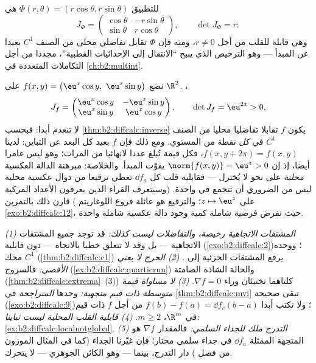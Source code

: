 \begin{example}\label{ex:b2:diffcalc:polar}
 للتطبيق $\Phi(r, \theta) = (r\cos\theta, r\sin\theta)$ هي
\[
J_\Phi = \begin{pmatrix} \cos\theta & -r\sin\theta\\ \sin\theta &
r\cos\theta \end{pmatrix},
\qquad \det J_\Phi = r :
\]
وهي قابلة للقلب من أجل $r \neq 0$، ومنه فإن $\Phi$ تقابل تفاضلي محلي من
الصنف $C^1$ بعيدا عن المبدأ --- وهو الترخيص الذي يبيح ``الانتقال
إلى الإحداثيات القطبية''، مجددا من أجل التكاملات المتعددة في
\cref{ch:b2:multint}.
\end{example}

\begin{example}\label{ex:b2:diffcalc:localnotglobal}
نضع $f(x, y) = \bigl(\eu^x\cos y,\ \eu^x\sin y\bigr)$ على
$\R^2$. ،
\[
J_f = \begin{pmatrix}
\eu^x\cos y & -\eu^x\sin y\\
\eu^x\sin y & \eu^x\cos y
\end{pmatrix},
\qquad
\det J_f = \eu^{2x} > 0 ,
\]
لا تنعدم أبدا: فبحسب \cref{thm:b2:diffcalc:inverse} يكون $f$ تقابلا تفاضليا محليا من
الصنف $C^1$ في \emph{كل} نقطة من المستوي.
ومع ذلك فإن $f$ بعيد كل البعد عن التباين: لدينا $f(x, y + 2\pi) = f(x, y)$، فكل قيمة
تُبلغ عددا لانهائيا من المرات؛ وهو ليس غامرا أيضا، إذ إن $\norm{f(x, y)} = \eu^x > 0$
يفوّت المبدأ. والخلاصة: مبرهنة الدالة العكسية \emph{محلية} على نحو
لا يُختزل --- فقابلية قلب كل $\dd f_a$ تعطي ترقيعا من دوال عكسية محلية
ليس من الضروري أن تتجمع في واحدة.
(وسيتعرف القراء الذين يعرفون الأعداد المركبة على $z \mapsto
\eu^z$؛ والترقيع هو
عائلة فروع اللوغاريتم.)
قارن ذلك بالتمرين \cref{exo:b2:diffcalc:12}، حيث تفرض فرضية شاملة كمية وجود دالة عكسية
شاملة واحدة.
\end{example}

\begin{remark}
\emph{(1) المشتقات الاتجاهية رخيصة، والتفاضلات ليست كذلك:} قد توجد
جميع المشتقات الاتجاهية --- بل وقد لا تتعلق خطيا بالاتجاه --- دون
قابلية  (\cref{exo:b2:diffcalc:2})؛ ووحده محك $C^1$
(\cref{thm:b2:diffcalc:c1}) يرفع المشتقات الجزئية إلى .
\emph{(2) الحرج لا يعني الأقصى:} فالسروج (\cref{ex:b2:diffcalc:quarticrun}) والحالة الشاذة
الصامتة (\cref{thm:b2:diffcalc:extrema}~(3)) كلتاهما تختبئان
وراء $\nabla f = 0$. \emph{(3) لا مساواة قيمة متوسطة ذات قيم متجهية:}
وحدها \emph{المتراجحة} في
\cref{thm:b2:diffcalc:mvi} تبقى صحيحة
(\cref{exo:b2:diffcalc:9})؛ ولا تكتب أبدا $f(b) - f(a) = \dd
f_c(b-a)$ من أجل $f$ ذات قيم في $\R^m$، $m \geq 2$.
\emph{(4) قابلية القلب المحلية ليست تباينا:}
\cref{ex:b2:diffcalc:localnotglobal}. \emph{(5) التدرج ملك للجداء السلمي:} فالمقدار $\nabla f$ هو
المتجهة الممثلة  $\dd f_a$ في جداء سلمي مختار؛ فإن غيّرنا الجداء
(كما في المثال الموزون من فصل ) دار التدرج، بينما
 --- وهو الكائن الجوهري --- لا يتحرك.
\end{remark}

